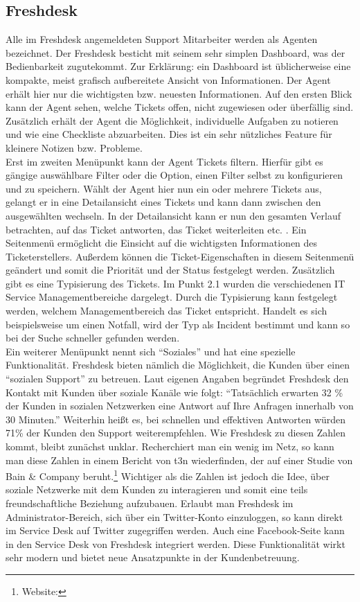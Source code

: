 \subsection{Freshdesk}
\noindent
Alle im Freshdesk angemeldeten Support Mitarbeiter werden als Agenten bezeichnet.
Der Freshdesk besticht mit seinem sehr simplen Dashboard, was der Bedienbarkeit zugutekommt. Zur Erklärung: ein Dashboard ist üblicherweise eine kompakte, meist grafisch aufbereitete Ansicht von Informationen. Der Agent erhält hier nur die wichtigsten bzw. neuesten Informationen. Auf den ersten Blick kann der Agent sehen, welche Tickets offen, nicht zugewiesen oder überfällig sind. Zusätzlich erhält der Agent die Möglichkeit, individuelle Aufgaben zu notieren und wie eine Checkliste abzuarbeiten. Dies ist ein sehr nützliches Feature für kleinere Notizen bzw. Probleme.\\ 
Erst im zweiten Menüpunkt kann der Agent Tickets filtern. Hierfür gibt es gängige auswählbare Filter oder die Option, einen Filter selbst zu konfigurieren und zu speichern. Wählt der Agent hier nun ein oder mehrere Tickets aus, gelangt er in eine Detailansicht eines Tickets und kann dann zwischen den ausgewählten wechseln. In der Detailansicht kann er nun den gesamten Verlauf betrachten, auf das Ticket antworten, das Ticket weiterleiten etc. . Ein Seitenmenü ermöglicht die Einsicht auf die wichtigsten Informationen des Ticketerstellers. Außerdem können die Ticket-Eigenschaften in diesem Seitenmenü geändert und somit die Priorität und der Status festgelegt werden. Zusätzlich gibt es eine Typisierung des Tickets. Im Punkt 2.1 wurden die verschiedenen IT Service Managementbereiche dargelegt. Durch die Typisierung kann festgelegt werden, welchem Managementbereich das Ticket entspricht. Handelt es sich beispielsweise um einen Notfall, wird der Typ als Incident bestimmt und kann so bei der Suche schneller gefunden werden.\\
Ein weiterer Menüpunkt nennt sich \enquote{Soziales} und hat eine spezielle Funktionalität. Freshdesk bieten nämlich die Möglichkeit, die Kunden über einen \enquote{sozialen Support} zu betreuen. Laut eigenen Angaben begründet Freshdesk den Kontakt mit Kunden über soziale Kanäle wie folgt: \enquote{Tatsächlich erwarten 32 \% der Kunden in sozialen Netzwerken eine Antwort auf Ihre Anfragen innerhalb von 30 Minuten.} Weiterhin heißt es, bei schnellen und effektiven Antworten würden 71\% der Kunden den Support weiterempfehlen. Wie Freshdesk zu diesen Zahlen kommt, bleibt zunächst unklar. Recherchiert man ein wenig im Netz, so kann man diese Zahlen in einem Bericht von t3n wiederfinden, der auf einer Studie von  Bain \& Company beruht.\footnote{Website:\cite{Rixecker}} Wichtiger als die Zahlen ist jedoch die Idee, über soziale Netzwerke mit dem Kunden zu interagieren und somit eine teils freundschaftliche Beziehung aufzubauen. Erlaubt man Freshdesk im Administrator-Bereich, sich über ein Twitter-Konto einzuloggen, so kann direkt im Service Desk auf Twitter zugegriffen werden. Auch eine Facebook-Seite kann in den Service Desk von Freshdesk integriert werden. Diese Funktionalität wirkt sehr modern und bietet neue Ansatzpunkte in der Kundenbetreuung.\\
